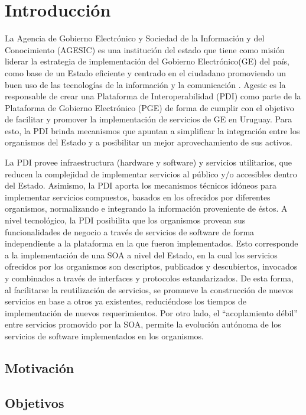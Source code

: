 \chapter{Introducción}
\label{capitulo1}
La Agencia de Gobierno Electrónico y Sociedad de la Información y del Conocimiento (AGESIC) es una institución del estado que tiene como misión liderar la estrategia de implementación del Gobierno Electrónico(GE) del país, como base de un Estado eficiente y centrado en el ciudadano promoviendo un buen uso de las tecnologías de la información y la comunicación \cite{Agesic_Mision_Vision}.
Agesic es la responsable de crear una Plataforma de Interoperabilidad (PDI) como parte de la Plataforma de Gobierno Electrónico (PGE) de forma de cumplir con el objetivo de facilitar y promover la implementación de servicios de GE en Uruguay.
Para esto, la PDI brinda mecanismos que apuntan a simplificar la integración entre los organismos del Estado y a posibilitar un mejor aprovechamiento de sus activos. 

La PDI provee infraestructura (hardware y software) y servicios utilitarios, que reducen la complejidad de implementar servicios al público y/o accesibles dentro del Estado. Asimismo, la PDI aporta los mecanismos técnicos idóneos para implementar servicios compuestos, basados en los ofrecidos por diferentes organismos, normalizando e integrando la información proveniente de éstos. 
A nivel tecnológico, la PDI posibilita que los organismos provean sus funcionalidades de negocio a través de servicios de software de forma independiente a la plataforma en la que fueron implementados. Esto corresponde a la implementación de una SOA a nivel del Estado, en la cual los servicios ofrecidos por los organismos son descriptos, publicados y descubiertos, invocados y combinados a través de interfaces y protocolos estandarizados. 
De esta forma, al facilitarse la reutilización de servicios, se promueve la construcción de nuevos servicios en base a otros ya existentes, reduciéndose los tiempos de implementación de nuevos requerimientos. Por otro lado, el “acoplamiento débil” entre servicios promovido por la SOA, permite la evolución autónoma de los servicios de software implementados en los organismos.
\citep{Agesic_PDI}

\section{Motivación}
\label{capitulo1:Motivacion}

\section{Objetivos}
\label{capitulo1:Objetivos}

